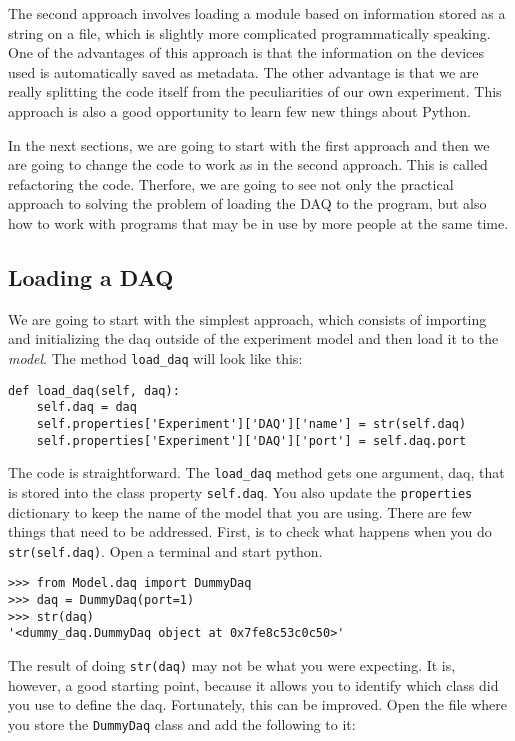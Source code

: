 {The second approach involves loading a module based on information stored as a string on a file, which is slightly more complicated programmatically speaking. One of the advantages of this approach is that the information on the devices used is automatically saved as metadata. The other advantage is that we are really splitting the code itself from the peculiarities of our own experiment. This approach is also a good opportunity to learn few new things about Python. 

In the next sections, we are going to start with the first approach and then we are going to change the code to work as in the second approach. This is called refactoring the code. Therfore, we are going to see not only the practical approach to solving the problem of loading the DAQ to the program, but also how to work with programs that may be in use by more people at the same time. 

\subsection{Loading a DAQ}\label{loading-a-daq}
We are going to start with the simplest approach, which consists of importing and initializing the daq outside of the experiment model and then load it to the \emph{model}. The method \texttt{load_daq} will look like this:

\begin{verbatim}
def load_daq(self, daq):
    self.daq = daq
    self.properties['Experiment']['DAQ']['name'] = str(self.daq)
    self.properties['Experiment']['DAQ']['port'] = self.daq.port
\end{verbatim}

The code is straightforward. The \texttt{load_daq} method gets one
argument, daq, that is stored into the class property \texttt{self.daq}.
You also update the \texttt{properties} dictionary to keep the name of
the model that you are using. There are few things that need to be
addressed. First, is to check what happens when you do
\texttt{str(self.daq)}. Open a terminal and start python.

\begin{verbatim}
>>> from Model.daq import DummyDaq
>>> daq = DummyDaq(port=1)
>>> str(daq)
'<dummy_daq.DummyDaq object at 0x7fe8c53c0c50>'
\end{verbatim}

The result of doing \texttt{str(daq)} may not be what you were
expecting. It is, however, a good starting point, because it allows you
to identify which class did you use to define the daq. Fortunately, this
can be improved. Open the file where you store the \texttt{DummyDaq}
class and add the following to it:

}
